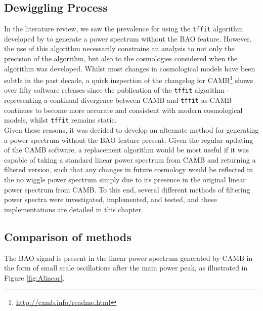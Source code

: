 \documentclass[titlesmallcaps, examinerscopy, copyrightpage]{uqthesis}
\begin{document}
\begin{appendices}


\chapter{Dewiggling Process} \label{app:dewiggle}

In the literature review, we saw the prevalence for using the \verb;tffit; algorithm developed by \citet{EisensteinHu1998} to generate a power spectrum without the BAO feature. However, the use of this algorithm necessarily constrains an analysis to not only the precision of the algorithm, but also to the cosmologies considered when the algorithm was developed. Whilst most changes in cosmological models have been subtle in the past decade, a quick inspection of the changelog for CAMB\footnote{\url{http://camb.info/readme.html}} \citep{Lewis2000} shows over fifty software releases since the publication of the \verb;tffit; algorithm - representing a continual divergence between CAMB and \verb;tffit; as CAMB continues to become more accurate and consistent with modern cosmological models, whilst \verb;tffit; remains static. \\

Given these reasons, it was decided to develop an alternate method for generating a power spectrum without the BAO feature present. Given the regular updating of the CAMB software, a replacement algorithm would be most useful if it was capable of taking a standard linear power spectrum from CAMB and returning a filtered version, such that any changes in future cosmology would be reflected in the no wiggle power spectrum simply due to its presence in the original linear power spectrum from CAMB. To this end, several different methods of filtering power spectra were investigated, implemented, and tested, and these implementations are detailed in this chapter.

\section{Comparison of methods}

The BAO signal is present in the linear power spectrum generated by CAMB in the form of small scale oscillations after the main power peak, as illustrated in Figure \ref{fig:Alinear}.


\end{appendices}
\end{document}
